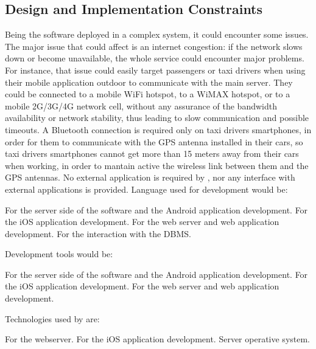 \subsection{Design and Implementation Constraints}
Being the software deployed in a complex system, it could encounter some issues.
The major issue that could affect \myTaxiService{} is an internet congestion: if the network slows down or become unavailable, the whole service could encounter major problems.
For instance, that issue could easily target passengers or taxi drivers when using their mobile application outdoor to communicate with the main server.
They could be connected to a mobile WiFi hotspot, to a WiMAX hotspot, or to a mobile 2G/3G/4G network cell, without any assurance of the bandwidth availability or network stability, thus leading to slow communication and possible timeouts.
A Bluetooth connection is required only on taxi drivers smartphones, in order for them to communicate with the GPS antenna installed in their cars, so taxi drivers smartphones cannot get more than 15 meters away from their cars when working, in order to mantain active the wireless link between them and the GPS antennas.
No external application is required by \myTaxiService{}, nor any interface with external applications is provided.
Language used for development would be:
\begin{itemize}
	 For the server side of the software and the Android application development.
	 For the iOS application development.
	 For the web server and web application development.
	 For the interaction with the DBMS.
\end{itemize}
Development tools would be:
\begin{itemize}
	 For the server side of the software and the Android application development.
	 For the iOS application development.
	 For the web server and web application development.
\end{itemize}
Technologies used by \myTaxiService{} are:
\begin{itemize}
	 For the webserver.
	 For the iOS application development.
	 Server operative system.
\end{itemize}
